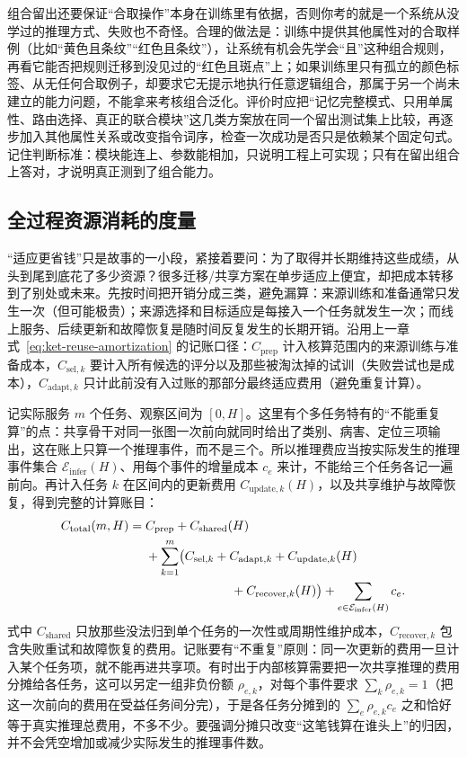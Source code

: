 组合留出还要保证“合取操作”本身在训练里有依据，否则你考的就是一个系统从没学过的推理方式、失败也不奇怪。合理的做法是：训练中提供其他属性对的合取样例（比如“黄色且条纹”“红色且条纹”），让系统有机会先学会“且”这种组合规则，再看它能否把规则迁移到没见过的“红色且斑点”上；如果训练里只有孤立的颜色标签、从无任何合取例子，却要求它无提示地执行任意逻辑组合，那属于另一个尚未建立的能力问题，不能拿来考核组合泛化。评价时应把“记忆完整模式、只用单属性、路由选择、真正的联合模块”这几类方案放在同一个留出测试集上比较，再逐步加入其他属性关系或改变指令词序，检查一次成功是否只是依赖某个固定句式。记住判断标准：模块能连上、参数能相加，只说明工程上可实现；只有在留出组合上答对，才说明真正测到了组合能力。

\subsection{全过程资源消耗的度量}
\label{sec:ket-evaluation-resources}

“适应更省钱”只是故事的一小段，紧接着要问：为了取得并长期维持这些成绩，从头到尾到底花了多少资源？很多迁移/共享方案在单步适应上便宜，却把成本转移到了别处或未来。先按时间把开销分成三类，避免漏算：来源训练和准备通常只发生一次（但可能极贵）；来源选择和目标适应是每接入一个任务就发生一次；而线上服务、后续更新和故障恢复是随时间反复发生的长期开销。沿用上一章式~\eqref{eq:ket-reuse-amortization} 的记账口径：$C_{\mathrm{prep}}$ 计入核算范围内的来源训练与准备成本，$C_{\mathrm{sel},k}$ 要计入所有候选的评分以及那些被淘汰掉的试训（失败尝试也是成本），$C_{\mathrm{adapt},k}$ 只计此前没有入过账的那部分最终适应费用（避免重复计算）。

记实际服务 $m$ 个任务、观察区间为 $[0,H]$。这里有个多任务特有的“不能重复算”的点：共享骨干对同一张图一次前向就同时给出了类别、病害、定位三项输出，这在账上只算一个推理事件，而不是三个。所以推理费应当按实际发生的推理事件集合 $\mathcal E_{\mathrm{infer}}(H)$、用每个事件的增量成本 $c_e$ 来计，不能给三个任务各记一遍前向。再计入任务 $k$ 在区间内的更新费用 $C_{\mathrm{update},k}(H)$，以及共享维护与故障恢复，得到完整的计算账目：
\begin{equation}
  \begin{aligned}
    C_{\mathrm{total}}(m,H)
    ={}&C_{\mathrm{prep}}+C_{\mathrm{shared}}(H)\\
       &+\sum_{k=1}^{m}\bigl(
        C_{\mathrm{sel},k}+C_{\mathrm{adapt},k}
        +C_{\mathrm{update},k}(H)\\
       &\hspace{24mm}+C_{\mathrm{recover},k}(H)\bigr)
        +\sum_{e\in\mathcal E_{\mathrm{infer}}(H)}c_e.
  \end{aligned}
  \label{eq:ket-evaluation-ledger}
\end{equation}
式中 $C_{\mathrm{shared}}$ 只放那些没法归到单个任务的一次性或周期性维护成本，$C_{\mathrm{recover},k}$ 包含失败重试和故障恢复的费用。记账要有“不重复”原则：同一次更新的费用一旦计入某个任务项，就不能再进共享项。有时出于内部核算需要把一次共享推理的费用分摊给各任务，这可以另定一组非负份额 $\rho_{e,k}$，对每个事件要求 $\sum_k\rho_{e,k}=1$（把这一次前向的费用在受益任务间分完），于是各任务分摊到的 $\sum_e\rho_{e,k}c_e$ 之和恰好等于真实推理总费用，不多不少。要强调分摊只改变“这笔钱算在谁头上”的归因，并不会凭空增加或减少实际发生的推理事件数。

